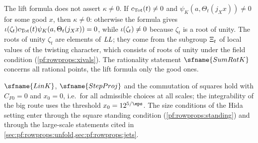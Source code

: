 \begin{remark}\label{pf:rowprops:rem:kappa}
The lift formula does not assert $\kappa\ne0$. If $c_{\mathrm{Tot}}(t)\ne0$ and $\psi_K(a,\Theta_t(j_Xx))\ne0$ for some good $x$,
then $\kappa\ne0$: otherwise the formula gives $\iota(\zeta_t)c_{\mathrm{Tot}}(t)\psi_K(a,\Theta_t(j_Xx))=0$, while
$\iota(\zeta_t)\ne0$ because $\zeta_t$ is a root of unity. The roots of unity $\zeta_t$ are elements of
$\mathit{LL}$; they come from the subgroup $\Xi_t$ of local values of the twisting character, which consists of
roots of unity under the field condition (\cref{pf:rowprops:xivals}). The rationality statement $\sfname{SumRatK}$
concerns all rational points, the lift formula only the good ones.
\end{remark}

\begin{remark}[Uniformity]\label{pf:rowprops:rem:uniform}
$\sfname{LinK}$, $\sfname{StepProj}$ and the commutation of squares hold with $C_{F0}=0$ and $x_0=0$, i.e.\ for all admissible
choices at all scales; the integrability of the big route uses the threshold $x_0=12^{5/\eps}$. The size conditions of the
Hida setting enter through the square standing condition (\cref{pf:rowprops:standing}) and through the large-scale
statements cited in \cref{sec:pf:rowprops:unfold,sec:pf:rowprops:jets}.
\end{remark}
